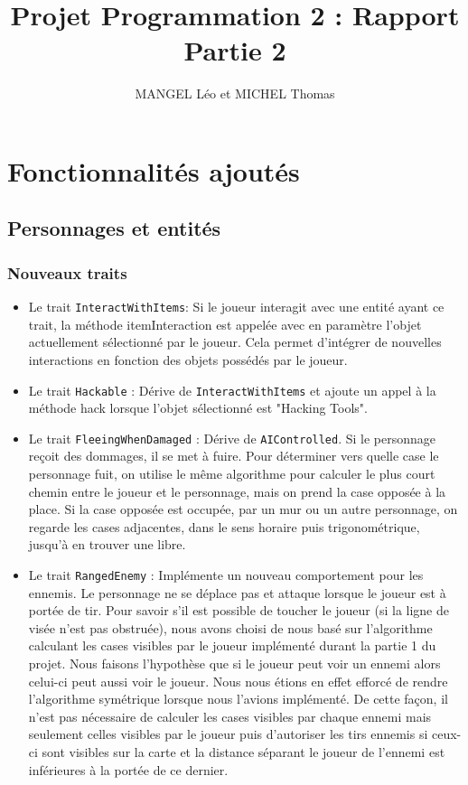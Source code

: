 \documentclass[10pt,a4paper]{article}
\title{Projet Programmation 2 : Rapport Partie 2}
\author{MANGEL Léo et MICHEL Thomas}
\date{}
\begin{document}
\maketitle

\section{Fonctionnalités ajoutés}

\subsection{Personnages et entités}
\subsubsection{Nouveaux traits}
\begin{itemize}
    \item Le trait \texttt{InteractWithItems}: Si le joueur interagit avec une entité ayant ce trait, la méthode itemInteraction est appelée avec en paramètre l'objet actuellement sélectionné par le joueur. Cela permet d'intégrer de nouvelles interactions en fonction des objets possédés par le joueur.
    \item Le trait \texttt{Hackable} : Dérive de \texttt{InteractWithItems} et ajoute un appel à la méthode hack lorsque l'objet sélectionné est "Hacking Tools".
    \item Le trait \texttt{FleeingWhenDamaged} : Dérive de \texttt{AIControlled}. Si le personnage reçoit des dommages, il se met à fuire. Pour déterminer vers quelle case le personnage fuit, on utilise le même algorithme pour calculer le plus court chemin entre le joueur et le personnage, mais on prend la case opposée à la place. Si la case opposée est occupée, par un mur ou un autre personnage, on regarde les cases adjacentes, dans le sens horaire puis trigonométrique, jusqu'à en trouver une libre.
    \item Le trait \texttt{RangedEnemy} : Implémente un nouveau comportement pour les ennemis. Le personnage ne se déplace pas et attaque lorsque le joueur est à portée de tir. Pour savoir s'il est possible de toucher le joueur (si la ligne de visée n'est pas obstruée), nous avons choisi de nous basé sur l'algorithme calculant les cases visibles par le joueur implémenté durant la partie 1 du projet. Nous faisons l'hypothèse que si le joueur peut voir un ennemi alors celui-ci peut aussi voir le joueur. Nous nous étions en effet efforcé de rendre l'algorithme symétrique lorsque nous l'avions implémenté. De cette façon, il n'est pas nécessaire de calculer les cases visibles par chaque ennemi mais seulement celles visibles par le joueur puis d'autoriser les tirs ennemis si ceux-ci sont visibles sur la carte et la distance séparant le joueur de l'ennemi est inférieures à la portée de ce dernier.
\end{itemize}
\end{document}
